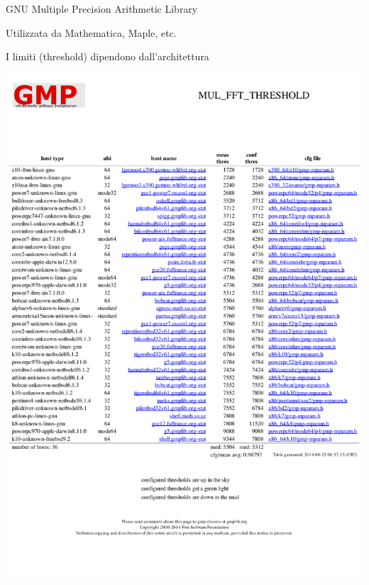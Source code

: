 \begin{frame}{GNU Multiple Precision Arithmetic Library}

\BI
\item Utilizzata da Mathematica, Maple, etc.
\item I limiti (threshold) dipendono dall'architettura
\EI

\includegraphics[width=\textwidth]{threshold.pdf}

\end{frame}


